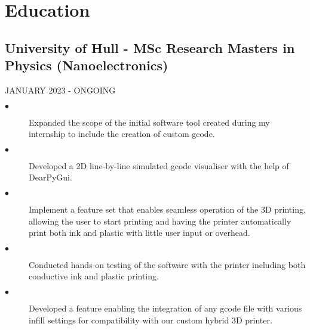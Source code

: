 \documentclass{article}
\begin{document}
\section{Education}
\noindent
\begin{minipage}[t]{0.48\textwidth}
    \subsection{University of Hull \textnormal{- MSc Research Masters in Physics (Nanoelectronics)}}
    \footnotesize{JANUARY 2023 - ONGOING}
    \normalsize{}
    \begin{description}
        \item[$\bullet$]Expanded the scope of the initial software tool created during my internship to include the creation of custom gcode. 
        \item[$\bullet$]Developed a 2D line-by-line simulated gcode visualiser with the help of DearPyGui.
        \item[$\bullet$]Implement a feature set that enables seamless operation of the 3D printing, allowing the user to start printing and having the printer automatically print both ink and plastic with little user input or overhead.
        \item[$\bullet$]Conducted hands-on testing of the software with the printer including both conductive ink and plastic printing.
        \item[$\bullet$]Developed a feature enabling the integration of any gcode file with various infill settings for compatibility with our custom hybrid 3D printer. 
    \end{description}
\end{minipage}
\hfill
\end{document}
